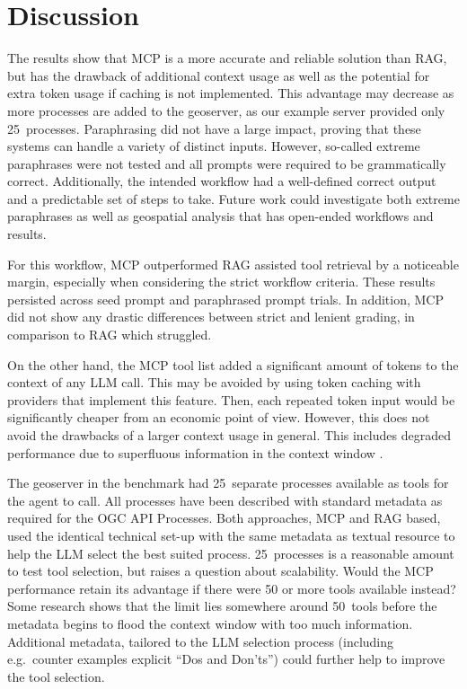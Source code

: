 \section{Discussion}
\label{sec:discussion}

The results show that MCP is a more accurate and reliable solution than RAG, but has the drawback
of additional context usage as well as the potential for extra token usage if caching is not
implemented. This advantage may decrease as more processes are added to the geoserver, as our
example server provided only 25~processes. Paraphrasing did not have a large impact, proving that
these systems can handle a variety of distinct inputs. However, so-called extreme paraphrases
were not tested and all prompts were required to be grammatically correct. Additionally, the
intended workflow had a well-defined correct output and a predictable set of steps to take.
Future work could investigate both extreme paraphrases as well as geospatial analysis that has
open-ended workflows and results.

For this workflow, MCP outperformed RAG assisted tool retrieval by a noticeable margin,
especially when considering the strict workflow criteria. These results persisted across seed
prompt and paraphrased prompt trials. In addition, MCP did not show any drastic differences
between strict and lenient grading, in comparison to RAG which struggled.

On the other hand, the MCP tool list added a significant amount of tokens to the context of any
LLM call. This may be avoided by using token caching with providers that implement this feature.
Then, each repeated token input would be significantly cheaper from an economic point of view.
However, this does not avoid the drawbacks of a larger context usage in general. This includes
degraded performance due to superfluous information in the context window
\citep{anthropic2025b}.

The geoserver in the benchmark had 25~separate processes available as tools for the agent to
call. All processes have been described with standard metadata as required for the OGC API
Processes. Both approaches, MCP and RAG based, used the identical technical set-up with the same
metadata as textual resource to help the LLM select the best suited process. 25~processes is a
reasonable amount to test tool selection, but raises a question about scalability. Would the MCP
performance retain its advantage if there were 50 or more tools available instead? Some research
shows that the limit lies somewhere around 50~tools before the metadata begins to flood the
context window with too much information. Additional metadata, tailored to the LLM selection
process (including e.g.\ counter examples explicit ``Dos and Don'ts'') could further help to
improve the tool selection.

